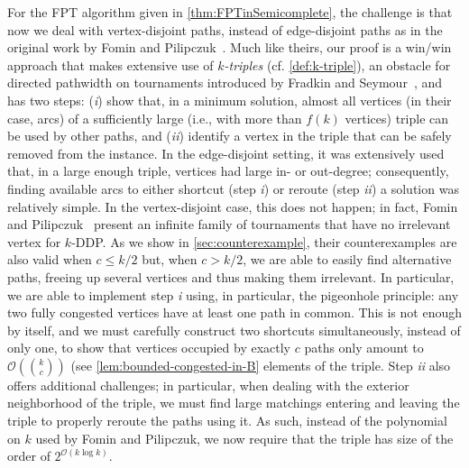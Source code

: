 \documentclass[a4paper,UKenglish,cleveref, autoref, thm-restate]{lipics-v2021}
\renewcommand{\FPT}{{\sf FPT}\xspace}
\newcommand{\pname}[1]{{\sc #1}}
\newcommand{\bigO}[1]{\mathcal{O}\!\left(#1\right)}
\begin{document}
For the \FPT algorithm given in \autoref{thm:FPTinSemicomplete}, the challenge is that now we deal with vertex-disjoint
paths, instead of edge-disjoint paths as in the original work by Fomin and
Pilipczuk~\cite{FominP19}. Much like theirs, our proof is a win/win approach that makes extensive use of \textit{$k$-triples} (cf. \autoref{def:k-triple}), an obstacle for directed pathwidth on tournaments introduced by Fradkin and Seymour~\cite{FradkinS13}, and has two steps:
(\textit{i}) show that, in a minimum solution, almost all vertices (in their case, arcs) of a sufficiently large (i.e., with more than $f(k)$ vertices) triple can be used by other paths, and (\textit{ii}) identify a vertex in the triple that can be safely removed from the instance.
In the edge-disjoint setting, it was extensively used that, in a large enough triple, vertices had large in- or out-degree; consequently, finding available arcs to either shortcut (step \textit{i}) or reroute (step \textit{ii}) a solution was relatively simple.
In the vertex-disjoint case, this does not happen; in fact, Fomin and Pilipczuk~\cite{FominP19} present an infinite family of tournaments that have no irrelevant vertex for \pname{$k$-DDP}. As we show in \autoref{sec:counterexample}, their counterexamples are also valid when $c \leq k/2$ but, when $c > k/2$, we are able to easily find alternative paths, freeing up several vertices and thus making them irrelevant.
In particular, we are able to implement step \textit{i} using, in particular, the pigeonhole principle: any two fully congested vertices have at least one path in common. This is not enough by itself, and we must carefully construct two shortcuts simultaneously, instead of only one, to show that vertices occupied by exactly $c$ paths only amount to $\bigO{\binom{k}{c}}$ (see \autoref{lem:bounded-congested-in-B} elements of the triple. Step \textit{ii} also offers additional challenges; in particular, when dealing with the exterior neighborhood of the triple, we must find large matchings entering and leaving the triple to properly reroute the paths using it.
As such, instead of the polynomial on $k$ used by Fomin and Pilipczuk, we now require that the triple has size of the order of $2^{\bigO{k\log k}}$.
\end{document}
